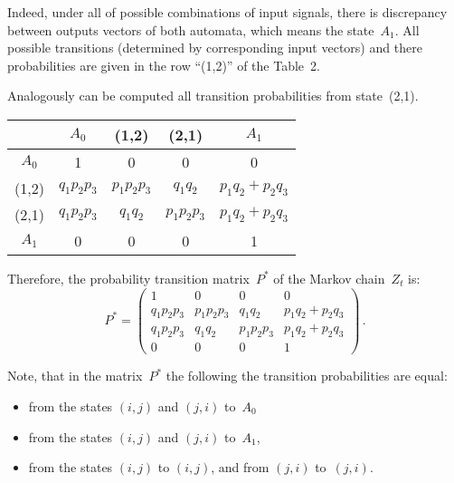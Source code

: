\begin{multicols}{2}
Indeed, under all of possible combinations of input
signals, there is discrepancy between outputs vectors
of both automata, which means the state~$A_1$.
All possible transitions (determined by corresponding
input vectors) and there probabilities are given in
the row ``(1,2)'' of the Table~2.

Analogously can be computed all transition probabilities
from state~(2,1).

\begin{table*}\small
\begin{center}
\Caption{\
}
\vspace*{2ex}

\begin{tabular}{ccccc}
\hline
       &   $A_0$  &    (1,2)   &   (2,1)   &   $A_1$    \\
\hline

$A_0$  &     1    &      0   &     0    &     0     \\
\hline
(1,2)  & $q_1p_2p_3$ & $p_1p_2p_3$ & $q_1q_2$ & $p_1q_2+p_2q_3$      \\
\hline
(2,1)  & $q_1p_2p_3$ & $q_1q_2$ & $p_1p_2p_3$ & $p_1q_2+p_2q_3$      \\
\hline
$A_1$  &    0      &    0      &    0      &    1         \\
\hline
\end{tabular}
\end{center}
\end{table*}


Therefore, the probability transition matrix~$P^*$ of
the Markov chain~$Z_t$ is:
$$
P^*
=
\begin{pmatrix}
1         &   0       &   0       &   0              \\
q_1p_2p_3 & p_1p_2p_3 & q_1q_2    &  p_1q_2+p_2q_3   \\
q_1p_2p_3 & q_1q_2    & p_1p_2p_3 &  p_1q_2+p_2q_3   \\
0         &   0       & 0         &   1              
\end{pmatrix}
\,.
$$

Note, that in the matrix~$P^*$ the following the
transition probabilities are equal:
\begin{itemize}
\item from the states $(i,j)$ and $(j,i)$ to~$A_0$
\item
from the states $(i,j)$ and $(j,i)$ to~$A_1$,
\item 
from the states $(i,j)$ to $(i,j)$,
and from $(j,i)$ to~$(j,i)$.
\end{itemize}


\end{multicols}
